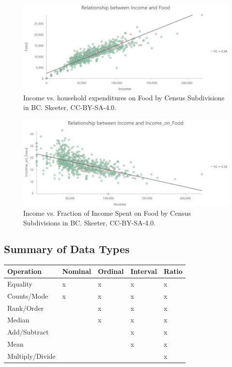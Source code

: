 \documentclass[
]{book}
\begin{document}
\begin{figure}
\includegraphics[width=0.75\linewidth]{images/03-income-v-food} \caption{Income vs. household expenditures on Food by Census Subdivisions in BC. Skeeter, CC-BY-SA-4.0.}\label{fig:3-income-v-food}
\end{figure}

\begin{figure}
\includegraphics[width=0.75\linewidth]{images/03-income-v-income-on-food} \caption{Income vs. Fraction of Income Spent on Food by Census Subdivisions in BC. Skeeter, CC-BY-SA-4.0.}\label{fig:3-income-v-income-on-food}
\end{figure}

\hypertarget{summary-of-data-types}{%
\subsection{Summary of Data Types}\label{summary-of-data-types}}

\begin{longtable}[]{@{}lllll@{}}
\toprule
Operation & Nominal & Ordinal & Interval & Ratio \\
\midrule
\endhead
Equality & x & x & x & x \\
Counts/Mode & x & x & x & x \\
Rank/Order & & x & x & x \\
Median & & x & x & x \\
Add/Subtract & & & x & x \\
Mean & & & x & x \\
Multiply/Divide & & & & x \\
\bottomrule
\end{longtable}
\end{document}
